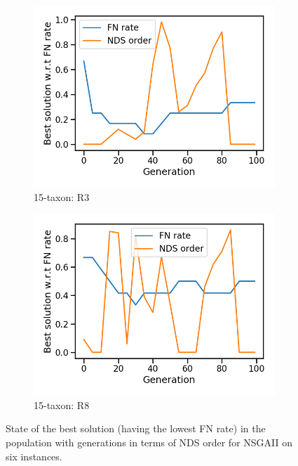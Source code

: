\begin{figure}[!h]
\begin{subfigure}[b]{0.33\textwidth}
		\includegraphics[width=\textwidth]{Figure/15-taxon_R3_run1_nds_order}
		\caption{15-taxon: R3}
\end{subfigure}\begin{subfigure}[b]{0.33\textwidth}
		\includegraphics[width=\textwidth]{Figure/15-taxon_R8_run1_nds_order}
		\caption{15-taxon: R8}
\end{subfigure}
	\caption{State of the best solution (having the lowest FN rate) in the population with generations in terms of NDS order for NSGAII on six instances. }
	\label{fig:nsgaii_issue2}
\end{figure}

